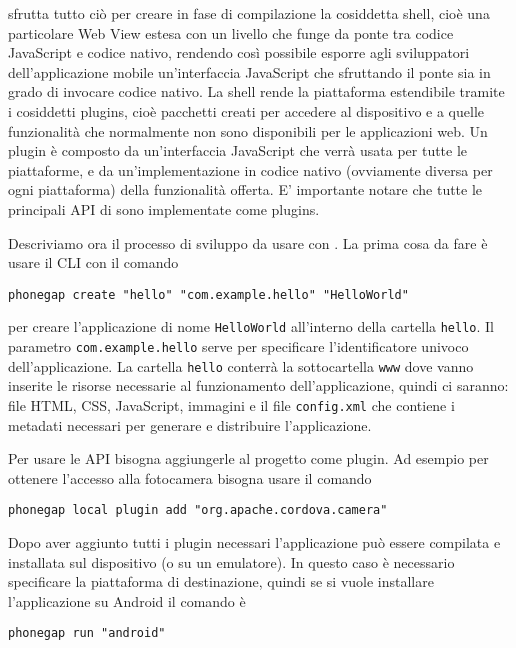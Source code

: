             \pg{} sfrutta tutto ciò per creare in fase di compilazione la
            cosiddetta shell, cioè una particolare
            Web View estesa con un livello che funge da ponte
            tra codice JavaScript e codice nativo, rendendo così possibile esporre
            agli sviluppatori dell'applicazione mobile un'interfaccia JavaScript
            che sfruttando il ponte sia in grado di invocare codice nativo.
            La shell rende la piattaforma \pg{} estendibile tramite i cosiddetti
            plugins, cioè pacchetti creati per accedere al dispositivo e a quelle
            funzionalità che normalmente non sono disponibili per le applicazioni
            web. Un plugin è composto da un'interfaccia JavaScript che
            verrà usata per tutte le piattaforme, e da un'implementazione
            in codice nativo (ovviamente diversa per ogni piattaforma)
            della funzionalità offerta.
            E' importante notare che tutte le principali API di \pg{} sono
            implementate come plugins.

            Descriviamo ora il processo di sviluppo da usare con \pg{}.
            La prima cosa da fare è usare il CLI con il comando
    \begin{lstlisting}[language=MyBash]
  phonegap create "hello" "com.example.hello" "HelloWorld"
    \end{lstlisting}
            per creare l'applicazione di nome \verb|HelloWorld| all'interno della cartella
            \verb|hello|. Il parametro \verb|com.example.hello| serve per
            specificare l'identificatore univoco dell'applicazione.
            La cartella \verb|hello| conterrà la sottocartella \verb|www| dove
            vanno inserite le risorse necessarie al funzionamento dell'applicazione,
            quindi ci saranno: file HTML, CSS, JavaScript, immagini e il file
            \verb|config.xml| che contiene i metadati necessari per generare e
            distribuire l'applicazione.

            Per usare le API bisogna aggiungerle al progetto come plugin. Ad
            esempio per ottenere l'accesso alla fotocamera bisogna usare il comando
    \begin{lstlisting}[language=MyBash]
  phonegap local plugin add "org.apache.cordova.camera"
    \end{lstlisting}

            Dopo aver aggiunto tutti i plugin necessari l'applicazione può
            essere compilata e installata sul dispositivo (o su un emulatore).
            In questo caso è necessario specificare la piattaforma di destinazione,
            quindi se si vuole installare l'applicazione su Android il comando è
    \begin{lstlisting}[language=MyBash]
  phonegap run "android"
    \end{lstlisting}

